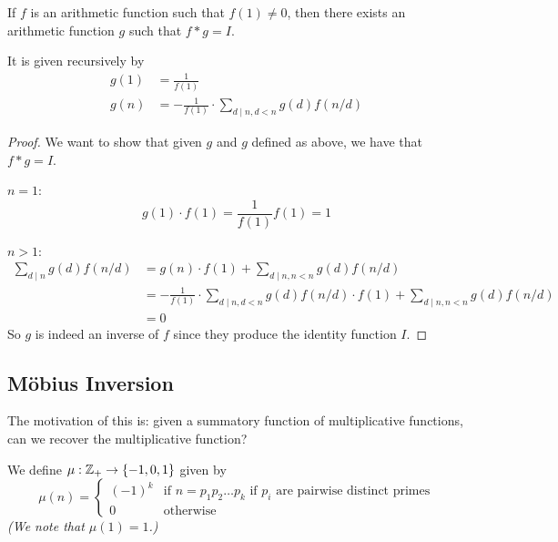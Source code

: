 \begin{lemma}
    If $f$ is an arithmetic function such that $f(1)\neq 0$, then there exists an arithmetic function $g$ such that $f * g = I$.

    It is given recursively by
    \begin{align*}
        g(1) & = \frac{1}{f(1)}                                         \\
        g(n) & = -\frac{1}{f(1)}\cdot \sum_{d\mid n, d < n} g(d) f(n/d)
    \end{align*}
\end{lemma}
\begin{proof}
    We want to show that given $g$ and $g$ defined as above, we have that $f * g = I$.

    $n=1$: \[g(1)\cdot f(1) = \frac{1}{f(1)}f(1) = 1\]

    $n > 1$: \begin{align*}
        \sum_{d\mid n}g(d) f(n/d) & = g(n)\cdot f(1) + \sum_{d\mid n, n<n}g(d) f(n/d)                   \\
                                  & = -\frac{1}{f(1)}\cdot \sum_{d\mid n, d < n} g(d) f(n/d) \cdot f(1)
        + \sum_{d\mid n, n<n}g(d) f(n/d)                                                                \\
                                  & = 0
    \end{align*}
    So $g$ is indeed an inverse of $f$ since they produce the identity function $I$.
\end{proof}

\subsection{M\"obius Inversion}
The motivation of this is: given a summatory function of multiplicative functions, can we recover the multiplicative function?
\begin{definition}
    We define $\mu : \mathbb Z_+ \to \{-1, 0, 1\}$ given by
    \[\mu(n) = \begin{cases}
            (-1)^k & \text{if $n = p_1p_2\dots p_k$ if $p_i$ are pairwise distinct primes} \\
            0      & \text{otherwise}
        \end{cases}\]
    \emph{(We note that $\mu(1) = 1$.)}
\end{definition}

